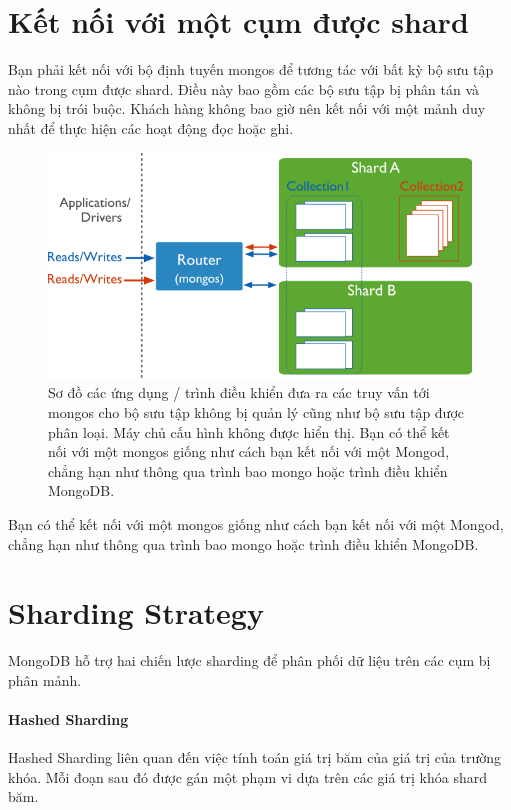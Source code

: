 \section{Kết nối với một cụm được shard}
Bạn phải kết nối với bộ định tuyến mongos để tương tác với bất kỳ bộ sưu tập nào trong cụm được shard. Điều này bao gồm các bộ sưu tập bị phân tán và không bị trói buộc. Khách hàng không bao giờ nên kết nối với một mảnh duy nhất để thực hiện các hoạt động đọc hoặc ghi.

\begin{figure}[h!]
\centering
\captionsetup{justification=centering,margin=1cm}
  	\includegraphics[scale=0.5]{charts/sharded-cluster-mixed.png}
  \caption{Sơ đồ các ứng dụng / trình điều khiển đưa ra các truy vấn tới mongos cho bộ sưu tập không bị quản lý cũng như bộ sưu tập được phân loại. Máy chủ cấu hình không được hiển thị. Bạn có thể kết nối với một mongos giống như cách bạn kết nối với một Mongod, chẳng hạn như thông qua trình bao mongo hoặc trình điều khiển MongoDB.}
  \end{figure}

Bạn có thể kết nối với một mongos giống như cách bạn kết nối với một Mongod, chẳng hạn như thông qua trình bao mongo hoặc trình điều khiển MongoDB.

\section{Sharding Strategy}
MongoDB hỗ trợ hai chiến lược sharding để phân phối dữ liệu trên các cụm bị phân mảnh.

\paragraph{Hashed Sharding}
Hashed Sharding liên quan đến việc tính toán giá trị băm của giá trị của trường khóa. Mỗi đoạn sau đó được gán một phạm vi dựa trên các giá trị khóa shard băm.

